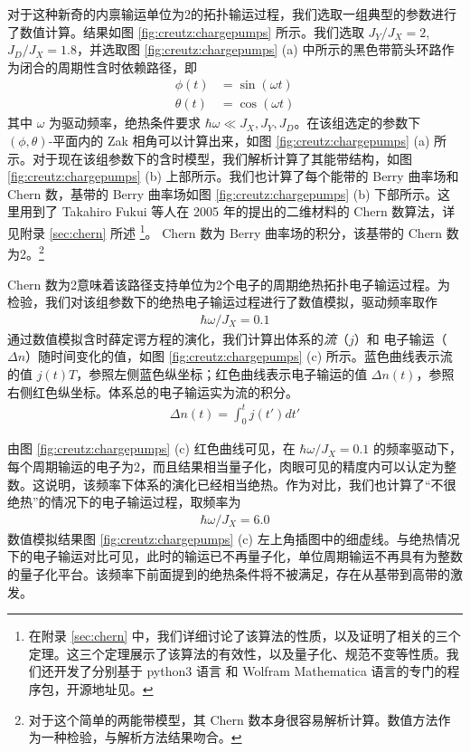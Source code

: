 对于这种新奇的内禀输运单位为2的拓扑输运过程，我们选取一组典型的参数进行了数值计算。结果如图 \ref{fig:creutz:chargepumps} 所示。我们选取 $J_Y/J_X=2$, $J_D/J_X=1.8$，并选取图 \ref{fig:creutz:chargepumps} (a) 中所示的黑色带箭头环路作为闭合的周期性含时依赖路径，即
\begin{align}
\phi(t) &= \sin(\omega t) \\ 
\theta(t) &= \cos(\omega t)
\end{align}
其中 $\omega$ 为驱动频率，绝热条件要求 $\hbar\omega\ll J_X, J_Y, J_D$。在该组选定的参数下 $(\phi, \theta)$-平面内的 Zak 相角可以计算出来\cite{creutz}，如图 \ref{fig:creutz:chargepumps} (a) 所示。对于现在该组参数下的含时模型，我们解析计算了其能带结构，如图 \ref{fig:creutz:chargepumps} (b) 上部所示。我们也计算了每个能带的 Berry 曲率场和 Chern 数，基带的 Berry 曲率场如图 \ref{fig:creutz:chargepumps} (b) 下部所示。这里用到了 Takahiro Fukui 等人在 2005 年的提出的二维材料的 Chern 数算法，详见附录 \ref{sec:chern} 所述
\footnote{在附录 \ref{sec:chern} 中，我们详细讨论了该算法的性质，以及证明了相关的三个定理。这三个定理展示了该算法的有效性，以及量子化、规范不变等性质。我们还开发了分别基于 python3 语言 和 Wolfram Mathematica 语言的专门的程序包，开源地址见。 }。 Chern 数为 Berry 曲率场的积分，该基带的 Chern 数为2。\footnote{对于这个简单的两能带模型，其 Chern 数本身很容易解析计算。数值方法作为一种检验，与解析方法结果吻合。}

Chern 数为2意味着该路径支持单位为2个电子的周期绝热拓扑电子输运过程。为检验，我们对该组参数下的绝热电子输运过程进行了数值模拟，驱动频率取作
\begin{align}
\hbar\omega/J_X = 0.1
\end{align}
通过数值模拟含时薛定谔方程的演化，我们计算出体系的\textit{流}（$j$）和 电子输运（$\Delta n$）随时间变化的值，如图 \ref{fig:creutz:chargepumps} (c) 所示。蓝色曲线表示流的值 $j(t)T$，参照左侧蓝色纵坐标；红色曲线表示电子输运的值 $\Delta n(t)$，参照右侧红色纵坐标。体系总的电子输运实为流的积分。
\begin{align}
\Delta n(t) = \int_0^t j(t')dt'
\end{align}

由图 \ref{fig:creutz:chargepumps} (c) 红色曲线可见，在 $\hbar\omega/J_X = 0.1$ 的频率驱动下，每个周期输运的电子为2，而且结果相当量子化，肉眼可见的精度内可以认定为整数。这说明，该频率下体系的演化已经相当绝热。作为对比，我们也计算了“不很绝热”的情况下的电子输运过程，取频率为
\begin{align}
\hbar\omega/J_X = 6.0
\end{align}
数值模拟结果图 \ref{fig:creutz:chargepumps} (c) 左上角插图中的细虚线。与绝热情况下的电子输运对比可见，此时的输运已不再量子化，单位周期输运不再具有为整数的量子化平台。该频率下前面提到的绝热条件将不被满足，存在从基带到高带的激发。





